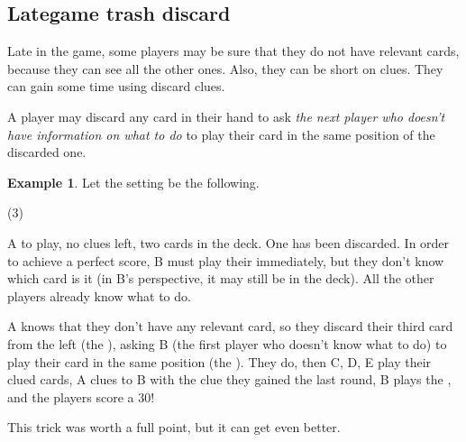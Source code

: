 \documentclass[a4paper]{article}
\theoremstyle{plain}
\theoremstyle{definition}
\newtheorem{example}[theorem]{Example}
\begin{document}
\subsection{Lategame trash discard}

Late in the game, some players may be sure that they do not have relevant cards, because they can see all the other ones. Also, they can be short on clues. They can gain some time using discard clues.

A player may discard any card in their hand to ask \textit{the next player who doesn't have information on what to do} to play their card in the same position of the discarded one.

\begin{example}
	
	Let the setting be the following.
	
	\begin{tasks}(3)
		\task[+]      
		\task[A]    
		\task[B]    
		\task[C]    
		\task[D]    
		\task[E]    
	\end{tasks}
	
	A to play, no clues left, two cards in the deck. One  has been discarded. In order to achieve a perfect score, B must play their  immediately, but they don't know which card is it (in B's perspective, it may still be in the deck). All the other players already know what to do.
	
	A knows that they don't have any relevant card, so they discard their third card from the left (the ), asking B (the first player who doesn't know what to do) to play their card in the same position (the ). They do, then C, D, E play their clued cards, A clues  to B with the clue they gained the last round, B plays the , and the players score a 30!
\end{example}

This trick was worth a full point, but it can get even better. 
\end{document}

